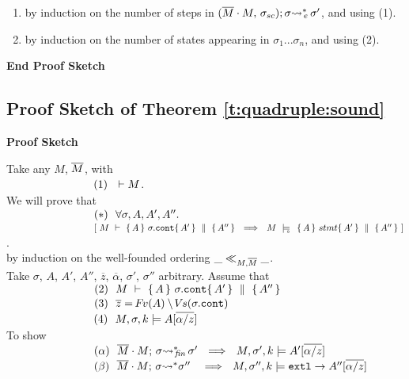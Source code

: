 {\begin{enumerate}
\item   by induction on the number of steps in $ (\overline{M}\cdot M,\, {\sigma_{sc}}); \sigma{\rightsquigarrow^*}\!\!_{e}\, \sigma' $, and using (1).

\item
 by induction on the number of states   appearing in ${\sigma_1...\sigma_n}$, and using (2).
\end{enumerate}

\textbf{End Proof Sketch}

\subsection{Proof Sketch of Theorem \ref{t:quadruple:sound} }
\label{s:app:proof:sketch;quadruples}
\noindent
\vspace{.2cm}
  {\textbf{Proof Sketch}} 


\noindent
Take any $M$, $\overline{M}$, with\\ 
$\strut \ \ \hspace{2.3cm} \ \ (1) \ \ \vdash M $.
\\
We will prove that\\
$\strut \ \ \hspace{2.3cm} \ \ (*)\ \ \forall \sigma, A, A', A''.$\\
$\strut \ \ \hspace{2.3cm} \ \ \ \ \  \ \ [ \ M\ \vdash\  \quadruple {A} {\sigma.\prg{cont}} {A'} {A''}  \ \ \Longrightarrow \ \    M\ \modelsD\  \quadruple {A} {stmt} {A'} {A''}\ ]$.\\
by induction on the well-founded ordering  $\_ \ll_{M,\overline{M}}  \_$.
\\
Take $\sigma$, $A$, $A'$, $A''$, $\overline z$, $\overline \alpha$, $\sigma'$, $\sigma''$  arbitrary. Assume that\\
$\strut \ \ \hspace{2.3cm} \ \ (2) \ \ M\ \vdash\  \quadruple {A} {\sigma.\prg{cont}} {A'} {A''}$\\
$\strut \ \ \hspace{2.3cm} \ \ (3) \ \ \overline z = \fv(A)\setminus \vs(\sigma.\prg{cont})$\\
$\strut \ \ \hspace{2.3cm} \ \ (4) \ \ \satDAssertFrom M  \sigma k   A[\overline{\alpha/z}]$\\
To show\\
$\strut \ \ \hspace{2.3cm} \ \ (\alpha) \ \    \leadstoBoundedStarFin {\Mtwo\cdot M}  {\sigma}  {\sigma'}\ \ \Longrightarrow\ \     \satDAssertFrom M  {\sigma'} k   A'[\overline{\alpha/z}]$\\
$\strut \ \ \hspace{2.3cm} \ \ (\beta) \ \    \leadstoBoundedStar  {\Mtwo\cdot M}  {\sigma}  {\sigma''}\ \ \ \Longrightarrow\ \     \satDAssertFrom M  {\sigma''}  k  \extThis \rightarrow A''[\overline{\alpha/z}]$
 
}
